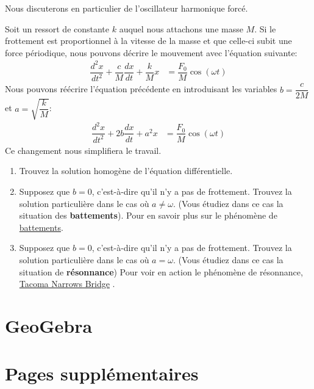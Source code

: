 \documentclass[]{book}
\providecommand{\tightlist}{%
  \setlength{\itemsep}{0pt}\setlength{\parskip}{0pt}}
\theoremstyle{definition}
\theoremstyle{definition}
\theoremstyle{definition}
\theoremstyle{remark}
\let\BeginKnitrBlock\begin \let\EndKnitrBlock\end
\begin{document}
Nous discuterons en particulier de l'oscillateur harmonique forcé.

\BeginKnitrBlock{example}[Oscillateur harmonique forcé]
\protect\hypertarget{exm:unnamed-chunk-92}{}{\label{exm:unnamed-chunk-92}
{} }Soit un ressort de
constante \(k\) auquel nous attachons une masse \(M\). Si le frottement
est proportionnel à la vitesse de la masse et que celle-ci subit une
force périodique, nous pouvons décrire le mouvement avec l'équation
suivante: \begin{align*}
\dfrac{d^2x}{dt^2}+\dfrac{c}{M}\dfrac{dx}{dt}+\dfrac{k}{M}x &= \dfrac{F_0}{M}\cos(\omega t)
\end{align*} Nous pouvons réécrire l'équation précédente en introduisant
les variables \(b=\dfrac{c}{2M}\) et \(a=\sqrt{\dfrac{k}{M}}\):
\begin{align*}
\dfrac{d^2x}{dt^2}+2b\dfrac{dx}{dt}+a^2x &= \dfrac{F_0}{M}\cos(\omega t)
\end{align*} Ce changement nous simplifiera le travail.

\begin{enumerate}
\def\labelenumi{\alph{enumi}.}
\tightlist
\item
  Trouvez la solution homogène de l'équation différentielle.
\item
  Supposez que \(b=0\), c'est-à-dire qu'il n'y a pas de frottement.
  Trouvez la solution particulière dans le cas où \(a\neq \omega\).
  (Vous étudiez dans ce cas la situation des \textbf{battements}). Pour
  en savoir plus sur le phénomène de
  \href{https://fr.wikipedia.org/wiki/Battement_(physique)}{battements}.
\item
  Supposez que \(b=0\), c'est-à-dire qu'il n'y a pas de frottement.
  Trouvez la solution particulière dans le cas où \(a =\omega\). (Vous
  étudiez dans ce cas la situation de \textbf{résonnance}) Pour voir en
  action le phénomène de résonnance,
  \href{https://www.youtube.com/watch?v=j-zczJXSxnw}{Tacoma Narrows
  Bridge} .
\end{enumerate}
\EndKnitrBlock{example}

\hypertarget{geogebra-edo}{%
\section{GeoGebra}\label{geogebra-edo}}

\hypertarget{applet_container}{}

\newpage

\hypertarget{pages-supplementaires-1}{%
\section{Pages supplémentaires}\label{pages-supplementaires-1}}
\end{document}
